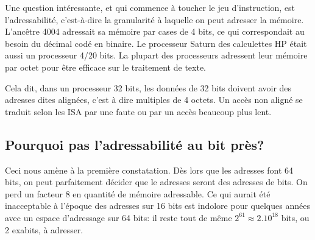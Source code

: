 \documentclass[architecture]{compas2018}
\begin{document}
\iffalse %
La croissance du bus de données a suivi avec du retard, pour plusieurs raisons.
La première est que la loi de Moore doit aussi fournir assez de transistors au processeur pour calculer sur des données de plus en plus grandes.
Mais la complexité des principales opérations d'un processeur travaillant sur $n$ bits est en $n$, en $n\log n$ ou au pire en $n^2$: si l'on a pu être à l'étroit jusque dans les années 90 pour construire un processeur qui peut calculer sur des adresses mémoires, ce n'est plus le cas depuis.
La seconde raison est que les ordinateurs servent beaucoup à travailler sur du texte, donc des octets.
On a donc vu des processeurs très populaires 8/16 bits, c'est à dire $w_d=8$ et  $w_a = 16$: les z80, 6502, 8088; des processeurs 16/32 bits (68000, 80286 à 486); et même une variante 8/32 bits, le 68008. Puis l'industrie a convergé vers 32/32 avec l'arrivée des processeurs RISC  (SPARC,  ARM et Power)  puis et 64/64 avec AMD64 et ARM64.
Ainsi,  
De nos jours, les processeurs ont des registres de plusieurs centaines de bits (AMD64 SSE* puis AVX*, ARM Neon), encore une fois parce que la loi de Moore le permet.
Mais ces registres sont des vecteurs de données d'au plus 64 bits.
\fi



Une question intéressante, et qui commence à toucher le jeu d'instruction, est l'adressabilité, c'est-à-dire la granularité à laquelle on peut adresser la mémoire.
L'ancêtre 4004 adressait sa mémoire par cases de 4 bits, ce qui correspondait au besoin du décimal codé en binaire. Le processeur Saturn des calculettes HP était aussi un processeur 4/20 bits.
La plupart des processeurs adressent leur mémoire par octet pour être efficace sur le traitement de texte.

Cela dit, dans un processeur 32 bits, les données de 32 bits doivent avoir des adresses dites alignées, c'est à dire multiples de 4 octets. Un accès non aligné se traduit selon les ISA par une faute ou par un accès beaucoup plus lent.


\subsection{Pourquoi pas l'adressabilité au bit près?}
Ceci nous amène à la première constatation. Dès lors que les adresses font 64 bits, on peut parfaitement décider  que le adresses seront des adresses de bits.
On perd un facteur 8 en quantité de mémoire adressable.
Ce qui aurait été inacceptable à l'époque des adresses sur 16 bits est indolore pour quelques années avec un espace d'adressage sur 64 bits: il reste tout de même $2^{61}\approx 2.10^{18}$ bits, ou 2 exabits, à adresser.
\end{document}
